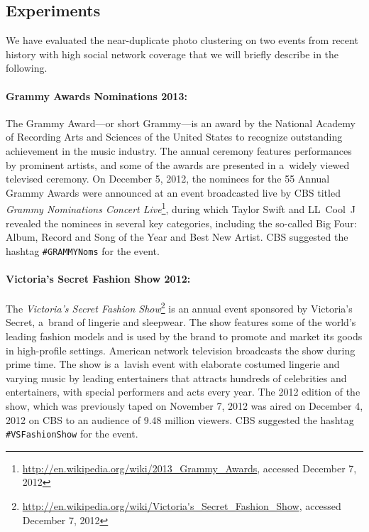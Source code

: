 \subsection{Experiments}

We have evaluated the near-duplicate photo clustering
on two events from recent history with high social network coverage
that we will briefly describe in the following.

\paragraph{Grammy Awards Nominations 2013:}

The Grammy Award---or short Grammy---is an award by
the National Academy of Recording Arts and Sciences of the United States
to recognize outstanding achievement in the music industry.
The annual ceremony features performances by prominent artists,
and some of the awards are presented in a~widely viewed televised ceremony.
On December 5, 2012, the nominees for the 55 Annual Grammy Awards
were announced at an event broadcasted live by CBS
titled \emph{Grammy Nominations Concert
Live}\footnote{\url{http://en.wikipedia.org/wiki/2013_Grammy_Awards},
accessed December 7, 2012},
during which Taylor Swift and LL~Cool~J revealed the nominees
in several key categories, including the so-called Big Four:
Album, Record and Song of the Year and Best New Artist.
CBS suggested the hashtag \texttt{\#GRAMMYNoms} for the event.

\paragraph{Victoria's Secret Fashion Show 2012:}

The \emph{Victoria's Secret Fashion
Show}\footnote{\url{http://en.wikipedia.org/wiki/Victoria's_Secret_Fashion_Show},
accessed December 7, 2012} is an annual event
sponsored by Victoria's Secret, a~brand of lingerie and sleepwear.
The show features some of the world's leading fashion models
and is used by the brand to promote and market its goods in high-profile settings.
American network television broadcasts the show during prime time.
The show is a~lavish event with elaborate costumed lingerie and
varying music by leading entertainers
that attracts hundreds of celebrities and entertainers,
with special performers and acts every year.
The 2012 edition of the show,
which was previously taped on November 7, 2012
was aired on December 4, 2012 on CBS
to an audience of 9.48 million viewers.
CBS suggested the hashtag \texttt{\#VSFashionShow} for the event.

